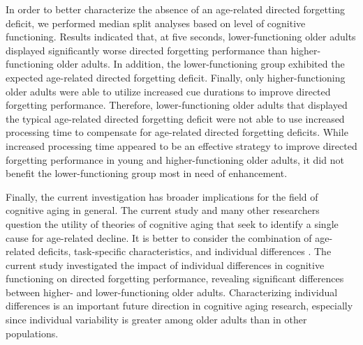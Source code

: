 \documentclass[man]{apa6}\usepackage[]{graphicx}\usepackage[]{color}
\begin{document}
In order to better characterize the absence of an age-related directed forgetting deficit, we performed median split analyses based on level of cognitive functioning. Results indicated that, at five seconds, lower-functioning older adults displayed significantly worse directed forgetting performance than higher-functioning older adults. In addition, the lower-functioning group exhibited the expected age-related directed forgetting deficit. Finally, only higher-functioning older adults were able to utilize increased cue durations to improve directed forgetting performance. Therefore, lower-functioning older adults that displayed the typical age-related directed forgetting deficit were not able to use increased processing time to compensate for age-related directed forgetting deficits. While increased processing time appeared to be an effective strategy to improve directed forgetting performance in young and higher-functioning older adults, it did not benefit the lower-functioning group most in need of enhancement.

Finally, the current investigation has broader implications for the field of cognitive aging in general. The current study and many other researchers question the utility of theories of cognitive aging that seek to identify a single cause for age-related decline. It is better to consider the combination of age-related deficits, task-specific characteristics, and individual differences \parencite{albinet.et.al2012}. The current study investigated the impact of individual differences in cognitive functioning on directed forgetting performance, revealing significant differences between higher- and lower-functioning older adults. Characterizing individual differences is an important future direction in cognitive aging research, especially since individual variability is greater among older adults than in other populations.

\printbibliography

\end{document}
